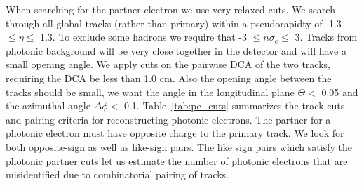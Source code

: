 When searching for the partner electron we use very relaxed cuts. We search through all global tracks (rather than primary) within a pseudorapidty of -1.3 $\leq \eta \leq$ 1.3. To exclude some hadrons we require that -3 $\leq n\sigma_e \leq$ 3. Tracks from photonic background will be very close together in the detector and will have a small opening angle. We apply cuts on the pairwise DCA of the two tracks, requiring the DCA be less than 1.0 cm. Also the opening angle between the tracks should be small, we want the angle in the longitudinal plane $\Theta <$ 0.05 and the azimuthal angle $\Delta\phi < $ 0.1. Table~\ref{tab:pe_cuts} summarizes the track cuts and pairing criteria for reconstructing photonic electrons. The partner for a photonic electron must have opposite charge to the primary track. We look for both opposite-sign as well as like-sign pairs. The like sign pairs which satisfy the photonic partner cuts let us estimate the number of photonic electrons that are misidentified due to combinatorial pairing of tracks.

